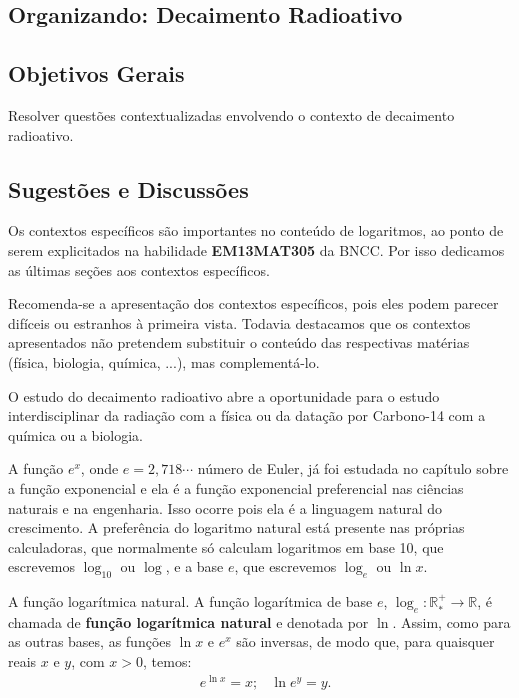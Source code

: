 \begin{texto}
{\def\currentcolor{session4}
\setlength\parskip{5pt}
	\section{Organizando: Decaimento Radioativo}
	\subsection{Objetivos Gerais}
	Resolver questões contextualizadas envolvendo o contexto de decaimento radioativo.

	\subsection{Sugestões e Discussões}
	Os contextos específicos são importantes no conteúdo de logaritmos, ao ponto de serem explicitados na habilidade \textbf{EM13MAT305} da BNCC. Por isso dedicamos as últimas seções aos contextos específicos.

	Recomenda-se a apresentação dos contextos específicos, pois eles podem parecer difíceis ou estranhos à primeira vista. Todavia destacamos que os contextos apresentados não pretendem substituir o conteúdo das respectivas matérias (física, biologia, química, ...), mas complementá-lo.

	O estudo do decaimento radioativo abre a oportunidade para o estudo interdisciplinar da radiação com a física ou da datação por Carbono-14 com a química ou a biologia.

}
\end{texto}



A função $e^x$, onde $e=2{,}718\cdots$ número de Euler, já foi estudada no capítulo sobre a função exponencial e ela é a função exponencial preferencial nas ciências naturais e na engenharia. Isso ocorre pois ela é a linguagem natural do crescimento. A preferência do logaritmo natural está presente nas próprias calculadoras, que normalmente só calculam logaritmos em base 10, que escrevemos $\log_{10}$ ou $\log$, e a base $e$, que escrevemos $\log_e$ ou $\ln x$.

\begin{observation}{A função logarítmica natural.}
A função logarítmica de base $e$, $\log_e: \mathbb{R}^+_* \to \mathbb{R}$, é chamada de \textbf{função logarítmica natural} e denotada por $\ln$. Assim, como para as outras bases, as funções $\ln x$ e $e^x$ são inversas, de modo que, para quaisquer reais $x$ e $y$, com $x>0$, temos:
\begin{align*}
& e^{\ln x} = x;
& \ln e^y = y.
\end{align*}
\end{observation}

